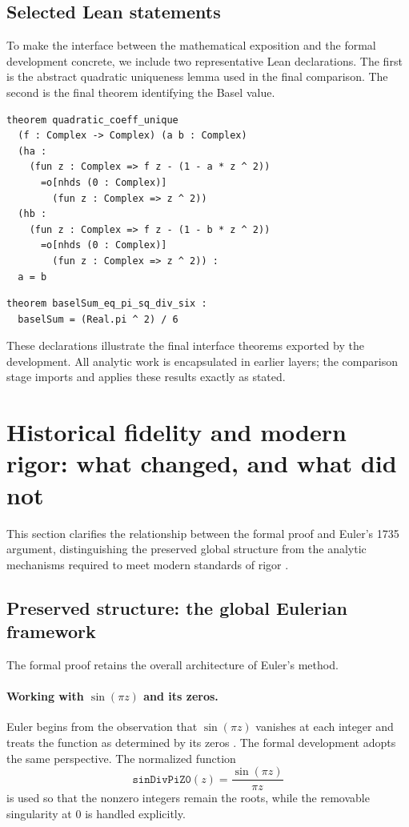 \documentclass[11pt,a4paper]{article}
\theoremstyle{plain}
\theoremstyle{definition}
\newcommand{\msec}[2]{\texorpdfstring{#1}{#2}}
\DeclareRobustCommand{\leanid}[1]{\texttt{#1}}
\newcommand{\sinDivPiZZero}{\leanid{sinDivPiZ0}}
\begin{document}
\subsection{Selected Lean statements}

To make the interface between the mathematical exposition and the formal development concrete, we include two representative Lean declarations. The first is the abstract quadratic uniqueness lemma used in the final comparison. The second is the final theorem identifying the Basel value.

\begin{Verbatim}[fontsize=\small, frame=single]
theorem quadratic_coeff_unique
  (f : Complex -> Complex) (a b : Complex)
  (ha :
    (fun z : Complex => f z - (1 - a * z ^ 2))
      =o[nhds (0 : Complex)]
        (fun z : Complex => z ^ 2))
  (hb :
    (fun z : Complex => f z - (1 - b * z ^ 2))
      =o[nhds (0 : Complex)]
        (fun z : Complex => z ^ 2)) :
  a = b
\end{Verbatim}

\begin{Verbatim}[fontsize=\small, frame=single]
theorem baselSum_eq_pi_sq_div_six :
  baselSum = (Real.pi ^ 2) / 6
\end{Verbatim}

These declarations illustrate the final interface theorems exported by the development. All analytic work is encapsulated in earlier layers; the comparison stage imports and applies these results exactly as stated.

\section{Historical fidelity and modern rigor: what changed, and what did not}

This section clarifies the relationship between the formal proof and Euler’s 1735 argument, distinguishing the preserved global structure from the analytic mechanisms required to meet modern standards of rigor \cite{EulerE041}.

\subsection{Preserved structure: the global Eulerian framework}

The formal proof retains the overall architecture of Euler’s method.

\paragraph{\msec{Working with \ensuremath{\sin(\pi z)} and its zeros}{Working with sin(pi z) and its zeros}.}
Euler begins from the observation that \(\sin(\pi z)\) vanishes at each integer and treats the function as determined by its zeros \cite{EulerE041}. The formal development adopts the same perspective. The normalized function
\[
\sinDivPiZZero(z)
=
\frac{\sin(\pi z)}{\pi z}
\]
is used so that the nonzero integers remain the roots, while the removable singularity at \(0\) is handled explicitly.
\end{document}
